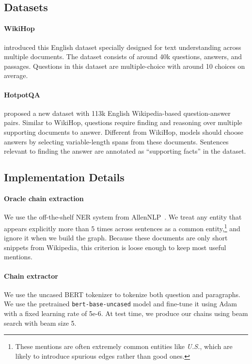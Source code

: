 \documentclass[11pt,a4paper]{article}
\begin{document}
\subsection{Datasets}

\paragraph{WikiHop} \citet{welbl2018constructing} introduced this English dataset specially designed for text understanding across multiple documents. The dataset consists of around 40k questions, answers, and passages. Questions in this dataset are multiple-choice with around 10 choices on average.

\paragraph{HotpotQA} \citet{yang2018hotpotqa} proposed a new dataset with 113k English Wikipedia-based question-answer pairs. Similar to WikiHop, questions require finding and reasoning over multiple supporting documents to answer. Different from WikiHop, models should choose answers by selecting variable-length spans from these documents. Sentences relevant to finding the answer are annotated as ``supporting facts'' in the dataset.

\subsection{Implementation Details}
\paragraph{Oracle chain extraction}We use the off-the-shelf NER system from AllenNLP~\citep{Gardner2017AllenNLP}. We treat any entity that appears explicitly more than 5 times across sentences as a common entity,\footnote{These mentions are often extremely common entities like \emph{U.S.}, which are likely to introduce spurious edges rather than good ones.} and ignore it when we build the graph. Because these documents are only short snippets from Wikipedia, this criterion is loose enough to keep most useful mentions.

\paragraph{Chain extractor}We use the uncased BERT tokenizer to tokenize both question and paragraphs. We use the pretrained \texttt{bert-base-uncased} model and fine-tune it using Adam with a fixed learning rate of 5e-6. At test time, we produce our chains using beam search with beam size 5.  
\end{document}
